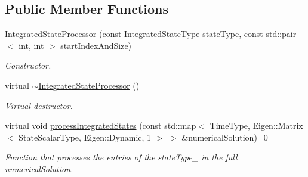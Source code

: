 \subsection*{Public Member Functions}
\begin{DoxyCompactItemize}
\item 
\hyperlink{classtudat_1_1propagators_1_1IntegratedStateProcessor_afe2a747863b453263a4398712346a9e9}{Integrated\+State\+Processor} (const Integrated\+State\+Type state\+Type, const std\+::pair$<$ int, int $>$ start\+Index\+And\+Size)
\begin{DoxyCompactList}\small\item\em Constructor. \end{DoxyCompactList}\item 
virtual \hyperlink{classtudat_1_1propagators_1_1IntegratedStateProcessor_ab0ec743ee7b147be2e5c8ee4e25a54a1}{$\sim$\+Integrated\+State\+Processor} ()\hypertarget{classtudat_1_1propagators_1_1IntegratedStateProcessor_ab0ec743ee7b147be2e5c8ee4e25a54a1}{}\label{classtudat_1_1propagators_1_1IntegratedStateProcessor_ab0ec743ee7b147be2e5c8ee4e25a54a1}

\begin{DoxyCompactList}\small\item\em Virtual destructor. \end{DoxyCompactList}\item 
virtual void \hyperlink{classtudat_1_1propagators_1_1IntegratedStateProcessor_a379cb44bfbb3506b9de350719e1a05ac}{process\+Integrated\+States} (const std\+::map$<$ Time\+Type, Eigen\+::\+Matrix$<$ State\+Scalar\+Type, Eigen\+::\+Dynamic, 1 $>$ $>$ \&numerical\+Solution)=0
\begin{DoxyCompactList}\small\item\em Function that processes the entries of the state\+Type\+\_\+ in the full numerical\+Solution. \end{DoxyCompactList}\end{DoxyCompactItemize}
